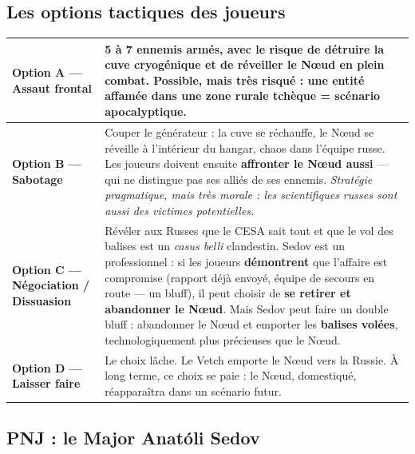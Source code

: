 \documentclass[10pt,a5paper,twoside]{book}
\begin{document}
\clearpage

\subsection{Les options tactiques des joueurs}

\begin{center}
\begin{tabular}{|P{3.0cm}|P{9.0cm}|}
\hline
\textbf{Option A — Assaut frontal} & 5 à 7 ennemis armés, avec le risque de \textbf{détruire la cuve cryogénique} et de réveiller le Nœud en plein combat. Possible, mais très risqué : une entité affamée dans une zone rurale tchèque = scénario apocalyptique. \\
\hline
\textbf{Option B — Sabotage} & Couper le générateur : la cuve se réchauffe, le Nœud se réveille à l'intérieur du hangar, chaos dans l'équipe russe. Les joueurs doivent ensuite \textbf{affronter le Nœud aussi} --- qui ne distingue pas ses alliés de ses ennemis. \emph{Stratégie pragmatique, mais très morale : les scientifiques russes sont aussi des victimes potentielles.} \\
\hline
\textbf{Option C — Négociation / Dissuasion} & Révéler aux Russes que le CESA sait tout et que le vol des balises est un \emph{casus belli} clandestin. Sedov est un professionnel : si les joueurs \textbf{démontrent} que l'affaire est compromise (rapport déjà envoyé, équipe de secours en route --- un bluff), il peut choisir de \textbf{se retirer et abandonner le Nœud}. Mais Sedov peut faire un double bluff : abandonner le Nœud et emporter les \textbf{balises volées}, technologiquement plus précieuses que le Nœud. \\
\hline
\textbf{Option D — Laisser faire} & Le choix lâche. Le Vetch emporte le Nœud vers la Russie. À long terme, ce choix se paie : le Nœud, domestiqué, réapparaîtra dans un scénario futur. \\
\hline
\end{tabular}
\end{center}

\clearpage

\subsection{PNJ : le Major Anatóli Sedov}
\end{document}
